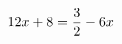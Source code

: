 \documentclass[preview]{standalone}
\begin{document}
\begin{align*}
\special{dvisvgm:raw <g id='unique000'>}12x + 8 = \frac{3}{2} - 6x\special{dvisvgm:raw </g>}
\end{align*}
\end{document}
